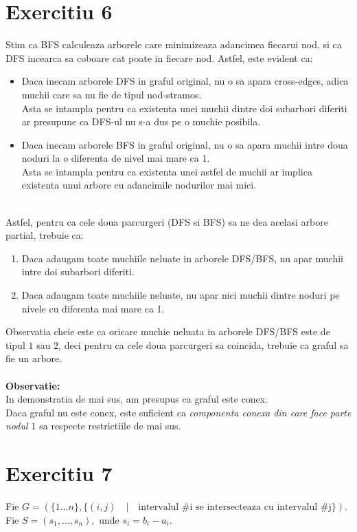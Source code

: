 \documentclass{article}
\begin{document}
\section*{Exercitiu 6}

Stim ca BFS calculeaza arborele care minimizeaza adancimea fiecarui nod, si ca DFS incearca sa coboare cat poate in fiecare nod.
Astfel, este evident ca:
\begin{itemize}
    \item Daca inecam arborele DFS in graful original, nu o sa apara cross-edges, adica muchii care sa nu fie de tipul nod-stramos.\\
    Asta se intampla pentru ca existenta unei muchii dintre doi subarbori diferiti ar presupune ca DFS-ul nu s-a dus pe o muchie posibila.
    \item Daca inecam arborele BFS in graful original, nu o sa apara muchii intre doua noduri la o diferenta de nivel mai mare ca 1.\\
    Asta se intampla pentru ca existenta unei astfel de muchii ar implica existenta unui arbore cu adancimile nodurilor mai mici.
\end{itemize}\\
Astfel, pentru ca cele doua parcurgeri (DFS si BFS) sa ne dea acelasi arbore partial, trebuie ca:
\begin{enumerate}
    \item Daca adaugam toate muchiile neluate in arborele DFS/BFS, nu apar muchii intre doi subarbori diferiti.
    \item Daca adaugam toate muchiile neluate, nu apar nici muchii dintre noduri pe nivele cu diferenta mai mare ca 1.
\end{enumerate}

Observatia cheie este ca oricare muchie neluata in arborele DFS/BFS este de tipul $1$ sau $2$, deci pentru ca cele doua parcurgeri sa coincida, trebuie ca graful sa fie un arbore.\\\\
\textbf{Observatie:}\\
In demonstratia de mai sus, am presupus ca graful este conex.\\
Daca graful nu este conex, este suficient ca \textit{componenta conexa din care face parte nodul $1$} sa respecte restrictiile de mai sus.
\section*{Exercitiu 7}

Fie $G = (\{1 \dots n\}, \{(i, j) \quad | \quad \mbox{intervalul #i se intersecteaza cu intervalul #j}\})$.\\
Fie $S = (s_1, \dots, s_n), \mbox{ unde } s_i = b_i - a_i$.\\
\end{document}
